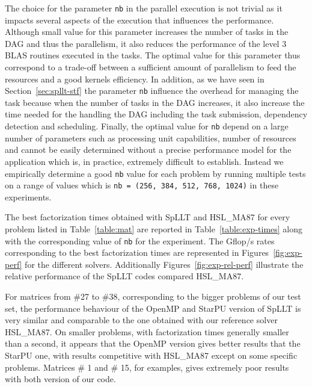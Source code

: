 \documentclass{article}
\newcommand{\alert}[1]{\textcolor{red}{#1}\xspace}
\newcommand{\starpu}{{StarPU}\xspace}
\newcommand{\TODO}[1]{\alert{TODO: #1}\xspace}
\newcommand{\openmp}{OpenMP\xspace}
\newcommand{\ma}{HSL\_MA87\xspace}
\newcommand{\spllt}{SpLLT\xspace}
\newcommand{\nb}{\texttt{nb}\xspace}
\begin{document}
The choice for the parameter \nb in the parallel execution is not
trivial as it impacts several aspects of the execution that influences
the performance. Although small value for this parameter increases the
number of tasks in the DAG and thus the parallelism, it also reduces
the performance of the level 3 BLAS routines executed in the
tasks. The optimal value for this parameter thus correspond to a
trade-off between a sufficient amount of parallelism to feed the
resources and a good kernels efficiency. In addition, as we have seen
in Section~\ref{sec:spllt-stf} the parameter \nb influence the
overhead for managing the task because when the number of tasks in the
DAG increases, it also increase the time needed for the handling the
DAG including the task submission, dependency detection and
scheduling. Finally, the optimal value for \nb depend on a large
number of parameters such as processing unit capabilities, number of
resources and cannot be easily determined without a precise
performance model for the application which is, in practice, extremely
difficult to establish. Instead we empirically determine a good \nb
value for each problem by running multiple tests on a range of values
which is \texttt{nb = (256, 384, 512, 768, 1024)} in these experiments.

The best factorization times obtained with \spllt and \ma for every
problem listed in Table~\ref{table:mat} are reported in
Table~\ref{table:exp-times} along with the corresponding value of \nb
for the experiment. The Gflop/s rates corresponding to the best
factorization times are represented in Figures~\ref{fig:exp-perf} for
the different solvers. Additionally Figures~\ref{fig:exp-rel-perf}
illustrate the relative performance of the \spllt codes compared \ma.

For matrices from \#27 to \#38, corresponding to the bigger problems
of our test set, the performance behaviour of the \openmp and \starpu
version of \spllt is very similar and comparable to the one obtained
with our reference solver \ma. On smaller problems, with factorization
times generally smaller than a second, it appears that the \openmp
version gives better results that the \starpu one, with results
competitive with \ma except on some specific problems. Matrices \# 1
and \# 15, for examples, gives extremely poor results with both
version of our code.

\end{document}
